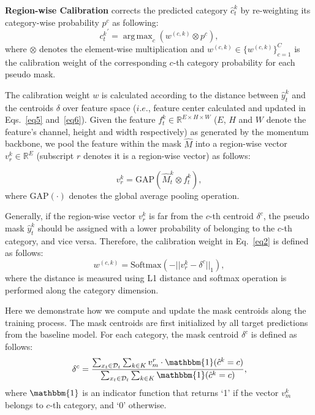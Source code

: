 \documentclass[10pt,twocolumn,letterpaper]{article}
\DeclareMathOperator*{\argmax}{arg\,max}
\begin{document}
\noindent \textbf{Region-wise Calibration} corrects the predicted category $\hat{c}_t^k$ by re-weighting its category-wise probability $p^{c}$ as following:
\begin{equation}
\label{eq2}
 {c_t^k}^{\prime} = \argmax_c (w^{(c,k)} \otimes p^{c}), 
\end{equation}
where $\otimes$ denotes the element-wise multiplication and $w^{(c,k)} \in \{w^{(c,k)} \}_{c=1}^C $ is the calibration weight of the corresponding $c$-th category probability for each pseudo mask. 

The calibration weight $w$ is calculated according to the distance between $\hat{y}_t^{k}$ and the centroids $\delta$ over feature space ($i.e.$, feature center calculated and updated in Eqs.~\ref{eq5} and~\ref{eq6}). Given the feature $f_t^k \in \mathbb{R}^{E \times H \times W}$ ($E$, $H$ and $W$ denote the feature's channel, height and width respectively) as generated by the momentum backbone, we pool the feature within the mask $\hat{M}$ into a region-wise vector $v_r^k \in \mathbb{R}^{E}$ (subscript $r$ denotes it is a region-wise vector) as follows:

\begin{equation}
\label{eq3}
  v_r^k = \text{GAP}(\hat{M}_t^k \otimes f_t^k), 
\end{equation}
where $\text{GAP}(\cdot)$ denotes the global average pooling operation.

Generally, if the region-wise vector $v_r^k$ is far from the $c$-th centroid $\delta^c$, the pseudo mask $\hat{y}_t^{k}$ should be assigned with a lower probability of belonging to the $c$-th category, and vice versa. Therefore, the calibration weight in Eq.~\ref{eq2} is defined as follows:
\begin{equation}
\label{eq4}
 w^{(c,k)} = \text{Softmax} (-||v_r^k - \delta^c ||_{1}) , 
\end{equation}
where the distance is measured using L1 distance and softmax operation is performed along the category dimension.

Here we demonstrate how we compute and update the mask centroids along the training process. The mask centroids are first initialized by all target predictions from the baseline model. For each category, the mask centroid $\delta^c$ is defined as follows:
\begin{equation}
\label{eq5}
\delta^{c} = \frac{\sum_{x_t \in \mathcal{D}_t} \sum_{k\in K} v^r_m \cdot \mathbbm{1}(\hat{c}^k = c)}{\sum_{x_t \in \mathcal{D}_t} \sum_{k\in K}\mathbbm{1}(\hat{c}^k = c) } ,
\end{equation}
where $\mathbbm{1}$ is an indicator function that returns `1' if the vector $v_m^k$ belongs to $c$-th category, and `0' otherwise.
\end{document}
